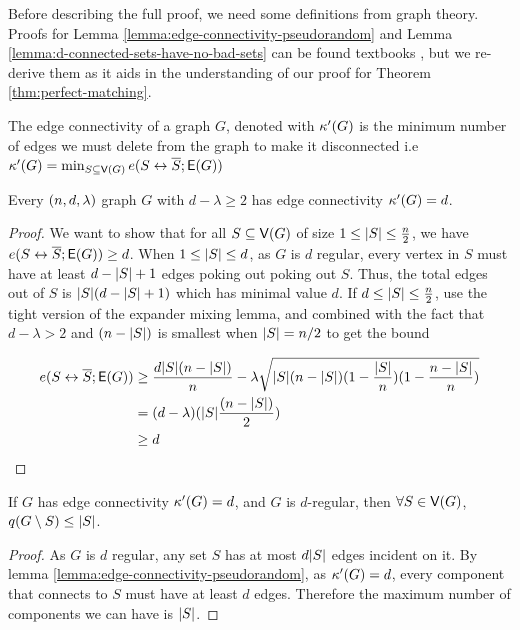 \documentclass[11pt]{article}
\begin{document}
Before describing the full proof, we need some definitions from graph theory.
Proofs for Lemma \ref{lemma:edge-connectivity-pseudorandom} and Lemma \ref{lemma:d-connected-sets-have-no-bad-sets} can be found textbooks \citep{krivelevich2006pseudo}, but we re-derive them as it aids in the understanding of our proof for Theorem \ref{thm:perfect-matching}.

\begin{definition}\label{def:edge-connectivity}
The edge connectivity of a graph $G$, denoted with $\kappa'(G)$ is the minimum number of edges we must delete from the graph to make it disconnected i.e $\kappa'(G) = \min_{S \subseteq \mathsf{V}(G)} e(S \leftrightarrow \overline{S}; \mathsf{E}(G))$
\end{definition}

\begin{lemma}\label{lemma:edge-connectivity-pseudorandom}
Every $(n, d, \lambda)$ graph $G$ with $d - \lambda \geq 2$ has edge connectivity $\kappa'(G) = d$.
\end{lemma}
\begin{proof}
  We want to show that for all $S \subseteq \mathsf{V}(G)$ of size $1 \leq |S| \leq \frac{n}{2}$, we have $e(S \leftrightarrow \overline{S}; \mathsf{E}(G)) \geq d$.
  When $1\leq |S| \leq d$, as $G$ is $d$ regular, every vertex in $S$ must have at least $d- |S| + 1$ edges poking out poking out $S$.
  Thus, the total edges out of $S$ is $|S|(d- |S| + 1)$ which has minimal value $d$.
  If $d \leq |S| \leq \frac{n}{2}$, use the tight version of the expander mixing lemma, and combined with the  fact that $d- \lambda > 2$ and $(n-|S|)$ is smallest when $|S| = n/2$ to get the bound

  \begin{align*}
    e(S \leftrightarrow \overline{S}; \mathsf{E}(G)) &\geq \frac{d|S|(n-|S|)}{n} - \lambda\sqrt{|S|(n-|S|) (1 - \frac{|S|}{n}) (1 - \frac{n-|S|}{n})   }\\
                                            &=  (d-\lambda)(|S|\frac{(n-|S|)}{2}) \\
                                              &\geq d
    \end{align*}
  
\end{proof}

\begin{lemma}\label{lemma:d-connected-sets-have-no-bad-sets}
  If $G$ has edge connectivity $\kappa'(G) = d$, and $G$ is $d$-regular, then $\forall S \in \mathsf{V}(G)$, $q(G \setminus S) \leq |S|$.
\end{lemma}
\begin{proof}
  As $G$ is $d$ regular, any set $S$ has at most $d|S|$ edges incident on it.
  By lemma \ref{lemma:edge-connectivity-pseudorandom}, as $\kappa'(G) = d$, every component that connects to $S$ must have at least $d$ edges.
  Therefore the maximum number of components we can have is $|S|$.
\end{proof}
\end{document}
